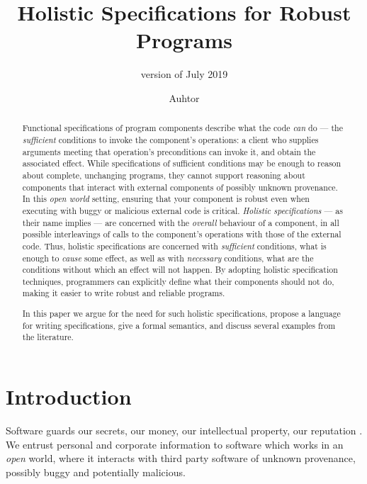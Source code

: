 \documentclass[acmsmall,screen]{acmart}
\newcommand{\sd}[1]{#1} %
\newcommand{\ponders}[3]{\marginpar{\tiny\itshape\raggedright\textcolor{#2}{\textbf{#1:} #3}}\ignorespaces}
\newcommand{\sophia}[1]{} %
\begin{document}
\author{Auhtor}

%
%


\title{Holistic Specifications for Robust Programs}
\subtitle{version of July 2019}


\begin{abstract}
Functional specifications of program components describe what
the code \emph{can} do --- the \emph{sufficient} conditions to
invoke the component's operations: 
 a client who supplies arguments
meeting that operation's preconditions can invoke it, %
  and obtain the associated effect.
While specifications of sufficient conditions may be enough to reason about %
complete, unchanging  programs, they cannot support reasoning about
 components that interact with external components of possibly unknown provenance. 
In this  \emph{open world} setting, ensuring that your component is robust even when executing 
with buggy or malicious external code is critical.
 \emph{Holistic specifications}
--- as their name implies --- 
are concerned  with the \emph{overall} behaviour of a component,  in all possible 
interleavings of calls to the component's operations with those of the external code.
Thus, holistic specifications are concerned with \emph{sufficient} conditions, \ie
what is enough to \emph{cause} some effect, as well as with \emph{necessary} conditions, \ie
what are the conditions without which an effect will not happen. 
By adopting holistic specification techniques,
programmers can explicitly define what their components should not do,
making it easier to write
robust and reliable programs.

In this paper we argue for the need for such holistic specifications,
 propose a %
 language \Chainmail for writing specifications, give a formal semantics, and discuss several
examples from the literature.
\end{abstract}


\maketitle

\section{Introduction}
 Software guards our secrets, our money, our intellectual property,
our reputation \cite{covern}.  We entrust personal and
corporate information to software which works in an \emph{open} world, 
where  it interacts with 
third party software of unknown provenance, possibly buggy and potentially malicious.
\end{document}
